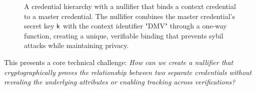 \begin{figure}
        \begin{pchstack}[boxed, center, space=4em]
            \begin{pcvstack}
            \end{pcvstack}
            \pcvspace
            \begin{pcvstack}
            \end{pcvstack}
        \end{pchstack}
        \begin{center}
        \end{center}
        \begin{pchstack}
            \begin{pcvstack}
            \end{pcvstack}
        \end{pchstack}
    \caption{A credential hierarchy with a nullifier that binds a context credential to a master credential. The nullifier combines the master credential's secret key $\mathsf{k}$ with the context identifier "DMV" through a one-way function, creating a unique, verifiable binding that prevents sybil attacks while maintaining privacy.}
    \label{fig:credential-nullifier}
\end{figure}

This presents a core technical challenge: \emph{How can we create a nullifier that cryptographically proves the relationship between two separate credentials without revealing the underlying attributes or enabling tracking across verifications?}

